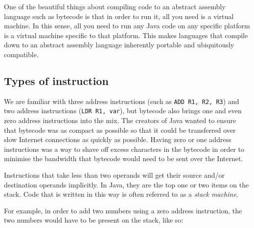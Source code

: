 
One of the beautiful things about compiling code to an abstract assembly
language such as bytecode is that in order to run it, all you need is a virtual
machine. In this sense, all you need to run any Java code on any specific
platform is a virtual machine specific to that platform. This makes languages
that compile down to an abstract assembly language inherently portable and
ubiquitously compatible.

\subsection{Types of instruction}

We are familiar with three address instructions (such as {\tt ADD R1, R2, R3})
and two address instructions ({\tt LDR R1, var}), but bytecode also brings one
and even zero address instructions into the mix. The creators of Java wanted to
ensure that bytecode was as compact as possible so that it could be transferred
over slow Internet connections as quickly as possible. Having zero or one
address instructions was a way to shave off excess characters in the bytecode in
order to minimise the bandwidth that bytecode would need to be sent over the
Internet.


Instructions that take less than two operands will get their source and/or
destination operands implicitly. In Java, they are the top one or two items on
the stack. Code that is written in this way is often referred to as a {\it stack
machine}.

For example, in order to add two numbers using a zero address instruction, the
two numbers would have to be present on the stack, like so:

\begin{center}
\begin{drawstack}
		
\end{drawstack}
\end{center}

